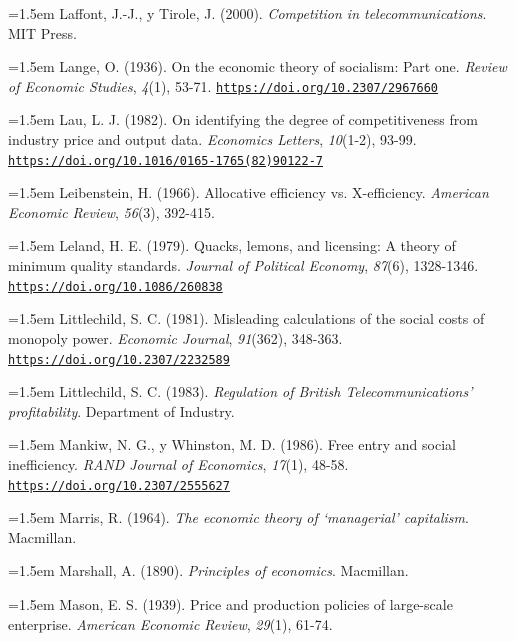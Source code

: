 \documentclass[10pt,a4paper]{article}
\begin{document}
\noindent\hangindent=1.5em Laffont, J.-J., y Tirole, J. (2000). \textit{Competition in telecommunications}. MIT Press.

\noindent\hangindent=1.5em Lange, O. (1936). On the economic theory of socialism: Part one. \textit{Review of Economic Studies}, \textit{4}(1), 53-71. \href{https://doi.org/10.2307/2967660}{\nolinkurl{https://doi.org/10.2307/2967660}}

\noindent\hangindent=1.5em Lau, L. J. (1982). On identifying the degree of competitiveness from industry price and output data. \textit{Economics Letters}, \textit{10}(1-2), 93-99. \href{https://doi.org/10.1016/0165-1765(82)90122-7}{\nolinkurl{https://doi.org/10.1016/0165-1765(82)90122-7}}

\noindent\hangindent=1.5em Leibenstein, H. (1966). Allocative efficiency vs. X-efficiency. \textit{American Economic Review}, \textit{56}(3), 392-415.

\noindent\hangindent=1.5em Leland, H. E. (1979). Quacks, lemons, and licensing: A theory of minimum quality standards. \textit{Journal of Political Economy}, \textit{87}(6), 1328-1346. \href{https://doi.org/10.1086/260838}{\nolinkurl{https://doi.org/10.1086/260838}}

\noindent\hangindent=1.5em Littlechild, S. C. (1981). Misleading calculations of the social costs of monopoly power. \textit{Economic Journal}, \textit{91}(362), 348-363. \href{https://doi.org/10.2307/2232589}{\nolinkurl{https://doi.org/10.2307/2232589}}

\noindent\hangindent=1.5em Littlechild, S. C. (1983). \textit{Regulation of British Telecommunications' profitability}. Department of Industry.

\noindent\hangindent=1.5em Mankiw, N. G., y Whinston, M. D. (1986). Free entry and social inefficiency. \textit{RAND Journal of Economics}, \textit{17}(1), 48-58. \href{https://doi.org/10.2307/2555627}{\nolinkurl{https://doi.org/10.2307/2555627}}

\noindent\hangindent=1.5em Marris, R. (1964). \textit{The economic theory of `managerial' capitalism}. Macmillan.

\noindent\hangindent=1.5em Marshall, A. (1890). \textit{Principles of economics}. Macmillan.

\noindent\hangindent=1.5em Mason, E. S. (1939). Price and production policies of large-scale enterprise. \textit{American Economic Review}, \textit{29}(1), 61-74.
\end{document}
